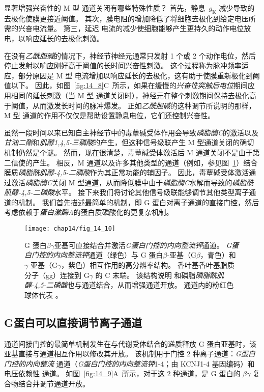 显著增强兴奋性的 M 型  通道关闭有哪些特殊性质？
首先，静息~$g_\text{K}$ 减少导致的去极化使膜更接近阈值。
其次，膜电阻的增加降低了将细胞去极化到给定电压所需的兴奋电流量。
第三，延迟  电流的减少使细胞能够产生更持久的动作电位放电，以响应延长的去极化刺激。


在没有\textit{乙酰胆碱}的情况下，神经节神经元通常只发射 1 个或 2 个动作电位，然后停止发射以响应刚好高于阈值的长时间兴奋性刺激。
这个过程称为脉冲频率适应，部分原因是 M 型  电流增加以响应延长的去极化，这有助于使膜重新极化到阈值以下。
因此，如图~\ref{fig:14_8}C~所示，如果在缓慢的\textit{兴奋性突触后电位}期间应用相同的延长刺激（当 M 型  通道关闭时），神经元在整个刺激期间保持去极化高于阈值，从而激发长时间的脉冲爆发。
正如\textit{乙酰胆碱}的这种调节所说明的那样，M 型  通道的作用不仅仅是帮助设置静息电位，它们还控制兴奋性。


虽然一段时间以来已知自主神经节中的毒蕈碱受体作用会导致\textit{磷脂酶C}的激活以及\textit{甘油二酯}和\textit{肌醇1,4,5-三磷酸}的产生，但这种信号级联产生 M 型通道关闭的确切机制仍然是个谜。
然而，现在很清楚，毒蕈碱受体激活后 M 通道关闭不是由于第二信使的产生。
相反，M 通道以及许多其他类型的通道（例如，参见图~\ref{fig:14_10}）结合膜质\textit{磷脂酰肌醇-4,5-二磷酸}作为其正常功能的辅因子。
因此，毒蕈碱受体激活通过激活\textit{磷脂酶C}关闭 M 型通道，从而降低膜中由于\textit{磷脂酶C}水解而导致的\textit{磷脂酰肌醇-4,5-二磷酸}水平。
接下来我们将讨论其他信号级联能够调节其他类型离子通道的机制。
我们首先描述最简单的机制，即 G 蛋白对离子通道的直接门控，然后考虑依赖于\textit{蛋白激酶A}的蛋白质磷酸化的更复杂机制。


\begin{figure}[htbp]
	\centering
	\texttt{[image: chap14/fig\_14\_10]}
	\caption{G 蛋白$\beta\gamma$亚基可直接结合并激活\textit{G蛋白门控的内向整流钾}通道。
		\textit{G蛋白门控的内向整流钾}通道（绿色）与 G 蛋白$\beta$-亚基（G$\beta$，青色）和 $\gamma$-亚基（G$\gamma$，紫色）相互作用的高分辨率结构。
		香叶基香叶基脂质分子（gg）连接到 G$\gamma$ 的 C 末端。
		该结构说明  和磷脂\textit{磷脂酰肌醇-4,5-二磷酸}也与通道结合，从而增强通道开放。
		通道内的粉红色球体代表 \cite{whorton2013x}。}
	\label{fig:14_10}
\end{figure}



\subsection{G蛋白可以直接调节离子通道}

通道间接门控的最简单机制发生在与代谢受体结合的递质释放 G 蛋白亚基时，该亚基直接与通道相互作用以修改其开放。
该机制用于门控 2 种离子通道：\textit{G蛋白门控的内向整流}  通道（\textit{G蛋白门控的内向整流钾}1-4；由 KCNJ1-4 基因编码）和电压依赖性  通道。
如图~\ref{fig:14_9}A~所示，对于这 2 种通道，是 G 蛋白的 $\beta \gamma$ 复合物结合并调节通道开放。


